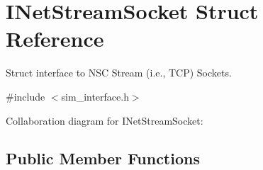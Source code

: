 \hypertarget{structINetStreamSocket}{}\section{I\+Net\+Stream\+Socket Struct Reference}
\label{structINetStreamSocket}


Struct interface to N\+SC Stream (i.\+e., T\+CP) Sockets.  




{\ttfamily \#include $<$sim\+\_\+interface.\+h$>$}



Collaboration diagram for I\+Net\+Stream\+Socket\+:
\subsection*{Public Member Functions}
